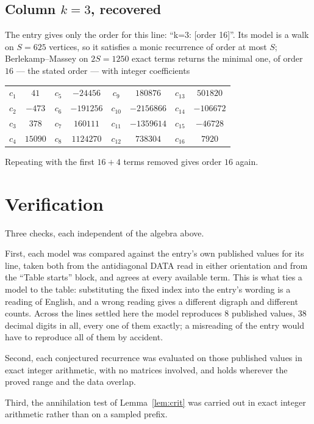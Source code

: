 \documentclass[11pt,a4paper]{article}
\theoremstyle{plain}
\theoremstyle{definition}
\begin{document}
\subsection*{Column $k=3$, recovered}
The entry gives only the order for this line: ``k=3: [order 16]''. Its model is a walk on
$S=625$ vertices, so it satisfies a monic recurrence of order at most $S$;
Berlekamp--Massey on $2S=1250$ exact terms returns the minimal one, of order
$16$ --- the stated order --- with integer coefficients
\begin{center}\small\begin{tabular}{cccccccc}
$c_{1}$ & $41$ & $c_{5}$ & $-24456$ & $c_{9}$ & $180876$ & $c_{13}$ & $501820$ \\
$c_{2}$ & $-473$ & $c_{6}$ & $-191256$ & $c_{10}$ & $-2156866$ & $c_{14}$ & $-106672$ \\
$c_{3}$ & $378$ & $c_{7}$ & $160111$ & $c_{11}$ & $-1359614$ & $c_{15}$ & $-46728$ \\
$c_{4}$ & $15090$ & $c_{8}$ & $1124270$ & $c_{12}$ & $738304$ & $c_{16}$ & $7920$ \\
\end{tabular}\end{center}
Repeating with the first $16+4$ terms removed gives order $16$ again.

\section{Verification}

Three checks, each independent of the algebra above.

First, each model was compared against the entry's own published values for its line, taken
both from the antidiagonal DATA read in either orientation and from the ``Table starts''
block, and agrees at every available term. This is what ties a model to the table:
substituting the fixed index into the entry's wording is a reading of English, and a wrong
reading gives a different digraph and different counts. Across the lines settled here the
model reproduces $8$ published values, $38$ decimal digits in all, every one of
them exactly; a misreading of the entry would have to reproduce all of them by accident.

Second, each conjectured recurrence was evaluated on those published values in exact
integer arithmetic, with no matrices involved, and holds wherever the proved range and the
data overlap.

Third, the annihilation test of Lemma~\ref{lem:crit} was carried out in exact integer
arithmetic rather than on a sampled prefix.
\end{document}

